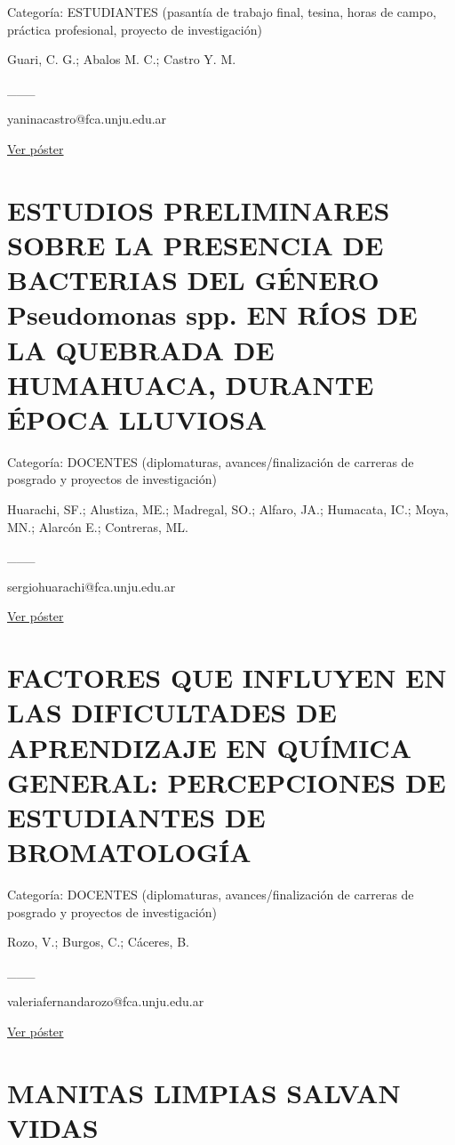 \documentclass[
  spanish,
  letterpaper,
  DIV=11,
  numbers=noendperiod]{scrreprt}
\begin{document}
Categoría: ESTUDIANTES (pasantía de trabajo final, tesina, horas de
campo, práctica profesional, proyecto de investigación)

Guari, C. G.; Abalos M. C.; Castro Y. M.

\_\_\_

yaninacastro@fca.unju.edu.ar

\href{https://drive.google.com/open?id=1OqNOEEWqdk1CE_rZT1S5ERMZPJOuwpk_}{Ver
póster}

\section{ESTUDIOS PRELIMINARES SOBRE LA PRESENCIA DE BACTERIAS DEL
GÉNERO Pseudomonas spp. EN RÍOS DE LA QUEBRADA DE HUMAHUACA, DURANTE
ÉPOCA
LLUVIOSA}\label{estudios-preliminares-sobre-la-presencia-de-bacterias-del-guxe9nero-pseudomonas-spp.-en-ruxedos-de-la-quebrada-de-humahuaca-durante-uxe9poca-lluviosa}

Categoría: DOCENTES (diplomaturas, avances/finalización de carreras de
posgrado y proyectos de investigación)

Huarachi, SF.; Alustiza, ME.; Madregal, SO.; Alfaro, JA.; Humacata, IC.;
Moya, MN.; Alarcón E.; Contreras, ML.

\_\_\_

sergiohuarachi@fca.unju.edu.ar

\href{https://drive.google.com/open?id=1RHGB2OosRE-HAdqoxklLM1XhnEE5r3BE}{Ver
póster}

\section{FACTORES QUE INFLUYEN EN LAS DIFICULTADES DE APRENDIZAJE EN
QUÍMICA GENERAL: PERCEPCIONES DE ESTUDIANTES DE
BROMATOLOGÍA}\label{factores-que-influyen-en-las-dificultades-de-aprendizaje-en-quuxedmica-general-percepciones-de-estudiantes-de-bromatologuxeda}

Categoría: DOCENTES (diplomaturas, avances/finalización de carreras de
posgrado y proyectos de investigación)

Rozo, V.; Burgos, C.; Cáceres, B.

\_\_\_

valeriafernandarozo@fca.unju.edu.ar

\href{https://drive.google.com/open?id=1HKugpS9Mjuy2OVabM8sR3CPBto3tg1bP}{Ver
póster}

\section{MANITAS LIMPIAS SALVAN
VIDAS}\label{manitas-limpias-salvan-vidas}
\end{document}
